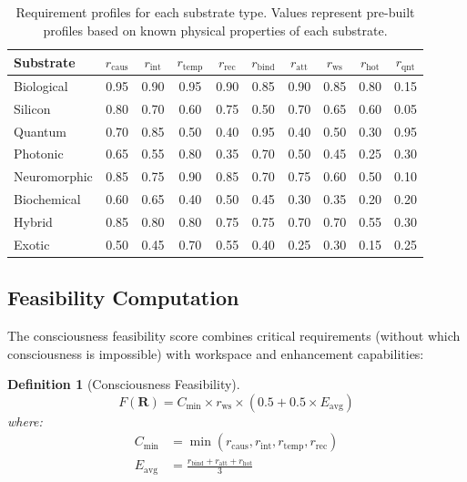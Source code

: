 \documentclass[12pt,a4paper]{article}
\newtheorem{definition}{Definition}
\begin{document}
\begin{table}[H]
\centering
\caption{Requirement profiles for each substrate type. Values represent pre-built profiles based on known physical properties of each substrate.}
\label{tab:requirement-profiles}
\begin{tabular}{l*{9}{c}}
\toprule
\textbf{Substrate} & $r_{\text{caus}}$ & $r_{\text{int}}$ & $r_{\text{temp}}$ & $r_{\text{rec}}$ & $r_{\text{bind}}$ & $r_{\text{att}}$ & $r_{\text{ws}}$ & $r_{\text{hot}}$ & $r_{\text{qnt}}$ \\
\midrule
Biological & 0.95 & 0.90 & 0.95 & 0.90 & 0.85 & 0.90 & 0.85 & 0.80 & 0.15 \\
Silicon & 0.80 & 0.70 & 0.60 & 0.75 & 0.50 & 0.70 & 0.65 & 0.60 & 0.05 \\
Quantum & 0.70 & 0.85 & 0.50 & 0.40 & 0.95 & 0.40 & 0.50 & 0.30 & 0.95 \\
Photonic & 0.65 & 0.55 & 0.80 & 0.35 & 0.70 & 0.50 & 0.45 & 0.25 & 0.30 \\
Neuromorphic & 0.85 & 0.75 & 0.90 & 0.85 & 0.70 & 0.75 & 0.60 & 0.50 & 0.10 \\
Biochemical & 0.60 & 0.65 & 0.40 & 0.50 & 0.45 & 0.30 & 0.35 & 0.20 & 0.20 \\
Hybrid & 0.85 & 0.80 & 0.80 & 0.75 & 0.75 & 0.70 & 0.70 & 0.55 & 0.30 \\
Exotic & 0.50 & 0.45 & 0.70 & 0.55 & 0.40 & 0.25 & 0.30 & 0.15 & 0.25 \\
\bottomrule
\end{tabular}
\end{table}

\subsection{Feasibility Computation}

The consciousness feasibility score combines critical requirements (without which consciousness is impossible) with workspace and enhancement capabilities:

\begin{definition}[Consciousness Feasibility]
\begin{equation}
F(\mathbf{R}) = C_{\min} \times r_{\text{ws}} \times \left(0.5 + 0.5 \times E_{\text{avg}}\right)
\label{eq:feasibility}
\end{equation}
where:
\begin{align}
C_{\min} &= \min(r_{\text{caus}}, r_{\text{int}}, r_{\text{temp}}, r_{\text{rec}}) \\
E_{\text{avg}} &= \frac{r_{\text{bind}} + r_{\text{att}} + r_{\text{hot}}}{3}
\end{align}
\end{definition}
\end{document}
